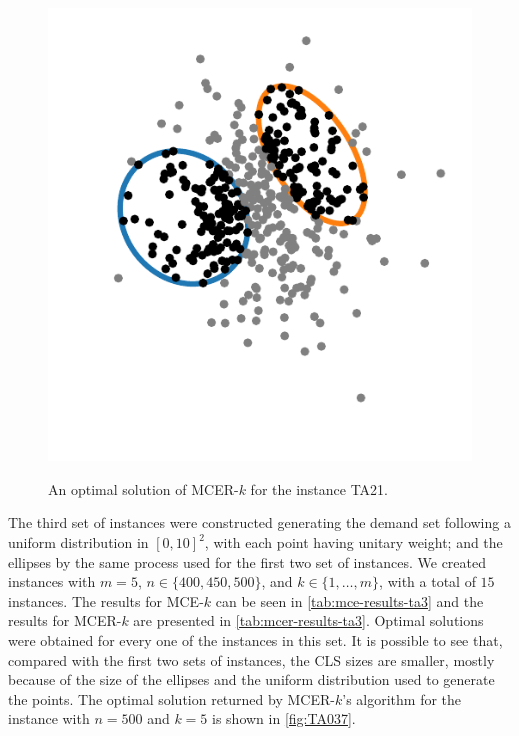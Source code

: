 \begin{figure}[H]
	\centering
	\caption{An optimal solution of MCER-$k$ for the instance TA21.}
	\includegraphics[scale=.8]{tex/figures/TA021}
	\fautor
	\label{fig:TA021}
\end{figure}

The third set of instances were constructed generating the demand set following a uniform distribution in $[0, 10]^2$, with each point having unitary weight; and the ellipses by the same process used for the first two set of instances. We created instances with $m=5$, $n\in \{400, 450, 500\}$, and $k\in\{1, \dots, m\}$, with a total of $15$ instances. The results for MCE-$k$ can be seen in \autoref{tab:mce-results-ta3} and the results for MCER-$k$ are presented in \autoref{tab:mcer-results-ta3}. Optimal solutions were obtained for every one of the instances in this set. It is possible to see that, compared with the first two sets of instances, the CLS sizes are smaller, mostly because of the size of the ellipses and the uniform distribution used to generate the points. The optimal solution returned by MCER-$k$'s algorithm for the instance with $n=500$ and $k=5$ is shown in \autoref{fig:TA037}.


